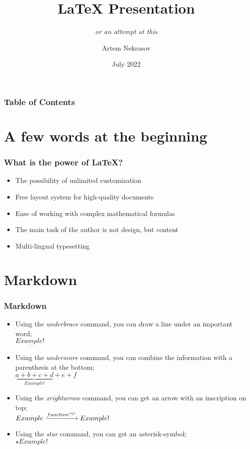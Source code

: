 \documentclass{beamer}
\title[HSE Internship]{LaTeX Presentation}
\subtitle{\textit{or an attempt at this}}
\author[Nekrasov]{Artem Nekrasov}
\date[July 2022]{July 2022}
\begin{document}
\frame{\titlepage}

\begin{frame}
\frametitle{Table of Contents}
\tableofcontents
\end{frame}


\section{A few words at the beginning}

\begin{frame}
\frametitle{What is the power of LaTeX?}

\begin{itemize}
    \item The possibility of unlimited customization
    \item Free layout system for high-quality documents
    \item Ease of working with complex mathematical formulas
    \item The main task of the author is not design, but content
    \item Multi-lingual typesetting
\end{itemize}
\end{frame}


\section{Markdown}


\begin{frame}
\frametitle{Markdown}

\begin{itemize}
    \item Using the \textit{underbrace} command, you can draw a line under an important word;
        \\ $\underline{Example!}$
    \item Using the \textit{underscore} command, you can combine the information with a parenthesis at the bottom;
        \\$\underbrace{a + b + c + d}_{Example!} + e + f$
    \item Using the \textit{xrightarrow} command, you can get an arrow with an inscription on top;
        \\$Example \xrightarrow[]{function "!"} Example!$
    \item Using the \textit{star} command, you can get an asterisk-symbol;
        \\$\star Example!$
\end{itemize}
\end{frame}
\end{document}
